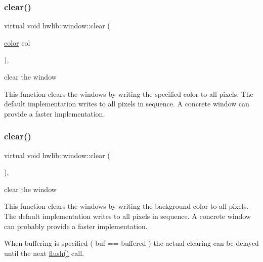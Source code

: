\mbox{\label{classhwlib_1_1window_af4c20108781e8e182008a961d6613532}} 
\subsubsection{\texorpdfstring{clear()}{clear()}\hspace{0.1cm}{\footnotesize\ttfamily [2/3]}}
{\footnotesize\ttfamily virtual void hwlib\+::window\+::clear (\begin{DoxyParamCaption}\item[{\hyperlink{classhwlib_1_1color}{color}}]{col }\end{DoxyParamCaption})\hspace{0.3cm}{\ttfamily [inline]}, {\ttfamily [virtual]}}

clear the window

This function clears the windows by writing the specified color to all pixels. The default implementation writes to all pixels in sequence. A concrete window can provide a faster implementation. \mbox{\label{classhwlib_1_1window_a5e781163353ce26cb4dc5b2cbe40ad05}} 
\subsubsection{\texorpdfstring{clear()}{clear()}\hspace{0.1cm}{\footnotesize\ttfamily [3/3]}}
{\footnotesize\ttfamily virtual void hwlib\+::window\+::clear (\begin{DoxyParamCaption}{ }\end{DoxyParamCaption})\hspace{0.3cm}{\ttfamily [inline]}, {\ttfamily [virtual]}}



clear the window 

This function clears the windows by writing the background color to all pixels. The default implementation writes to all pixels in sequence. A concrete window can probably provide a faster implementation.

When buffering is specified ( buf == buffered ) the actual clearing can be delayed until the next \hyperlink{classhwlib_1_1window_a2b654a98872d174173e1df24a444c949}{flush()} call. 

